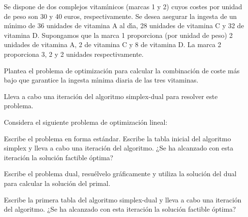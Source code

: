 \begin{problem}[11]

Se dispone de dos complejos vitam\'{\i}nicos (marcas 1 y 2) cuyos costes por unidad de peso son 30 y 40 euros, respectivamente. 
%
Se desea asegurar la ingesta de un m\'{\i}nimo de 36 unidades de vitamina A al d\'{\i}a, 28 unidades de vitamina C y 32 de vitamina D. 
%
Supongamos que la marca 1 proporciona (por unidad de peso) 2 unidades de vitamina A, 2 de vitamina C y 8 de vitamina D.
%
La marca 2 proporciona 3, 2 y 2 unidades respectivamente.

\ppart Plantea el problema de optimizaci\'on para calcular la combinaci\'on de coste m\'as bajo que garantice la ingesta m\'{\i}nima diaria de las tres vitaminas.

\ppart Lleva a cabo una iteraci\'on del algoritmo simplex-dual para resolver este problema.

\solution



\end{problem}


\begin{problem}[12]


Considera el siguiente problema de optimización lineal:

\begin{ioprob}
\end{ioprob}


\ppart Escribe el problema en forma estándar. 
%
Escribe la tabla inicial del algoritmo simplex y lleva a cabo una iteración del algoritmo. ¿Se ha alcanzado con esta iteración la solución factible óptima?

\ppart Escribe el problema dual, resuélvelo gráficamente y utiliza la solución del dual para calcular la solución del primal. 

\ppart Escribe la primera tabla del algoritmo simplex-dual y lleva a cabo una iteración del algoritmo. ¿Se ha alcanzado con esta iteración la solución factible óptima?


\solution



\end{problem}

